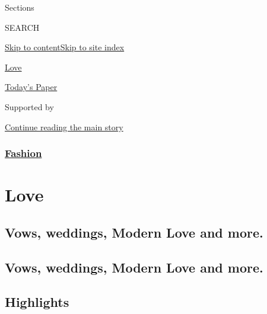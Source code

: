Sections

SEARCH

\protect\hyperlink{site-content}{Skip to
content}\protect\hyperlink{site-index}{Skip to site index}

\href{https://www.nytimes.com/section/fashion/weddings}{Love}

\href{https://myaccount.nytimes.com/auth/login?response_type=cookie\&client_id=vi}{}

\href{https://www.nytimes.com/section/todayspaper}{Today's Paper}

Supported by

\protect\hyperlink{after-sponsor}{Continue reading the main story}

\hypertarget{fashion}{%
\subsubsection{\texorpdfstring{\href{/section/fashion}{Fashion}}{Fashion}}\label{fashion}}

\hypertarget{love}{%
\section{Love}\label{love}}

\hypertarget{vows-weddings-modern-love-and-more}{%
\subsection{Vows, weddings, Modern Love and
more.}\label{vows-weddings-modern-love-and-more}}

\hypertarget{vows-weddings-modern-love-and-more-1}{%
\subsection{Vows, weddings, Modern Love and
more.}\label{vows-weddings-modern-love-and-more-1}}

\hypertarget{highlights}{%
\subsection{Highlights}\label{highlights}}

